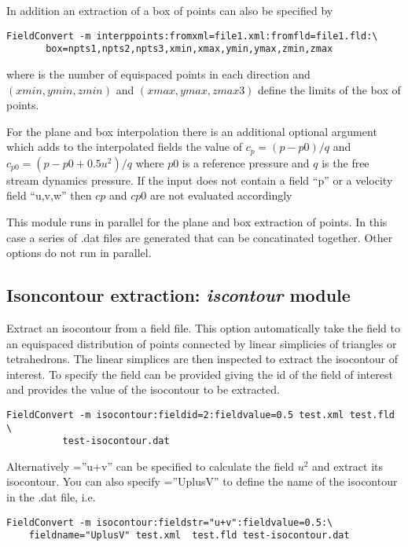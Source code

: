 In addition an extraction of a box of points can also be specified by
\begin{lstlisting}[style=BashInputStyle] 
  FieldConvert -m interppoints:fromxml=file1.xml:fromfld=file1.fld:\
       box=npts1,npts2,npts3,xmin,xmax,ymin,ymax,zmin,zmax
\end{lstlisting}
where  is the number of equispaced points in each 
direction and $(xmin,ymin,zmin)$ and $(xmax,ymax,zmax3)$ 
define the limits of the box of points. 

For the plane and box interpolation there is an additional optional
argument \inltt{cp=p0,q} which adds to the interpolated fields the value of
$c_p=(p-p0)/q$ and $c_{p0}=(p-p0+0.5 u^2)/q$ where $p0$ is a reference
pressure and $q$ is the free stream dynamics pressure. If the input
does not contain a field ``p'' or a velocity field ``u,v,w'' then $cp$
and $cp0$ are not evaluated accordingly
%
\begin{notebox} 
This module  runs in parallel for the plane and box extraction of points. In this case a series of .dat files are generated that can be concatinated together. Other options do not run in parallel.
\end{notebox}
%
%
%
\subsection{Isoncontour extraction: \textit{iscontour} module}

Extract an isocontour from a field file. This option automatically
take the field to an equispaced distribution of points connected by
linear simplicies of triangles or tetrahedrons. The linear simplices
are then inspected to extract the isocontour of interest. To specify
the field \inltt{fieldid} can be provided giving the id of the field
of interest and \inltt{fieldvalue} provides the value of the
isocontour to be extracted. 

\begin{lstlisting}[style=BashInputStyle]
  FieldConvert -m isocontour:fieldid=2:fieldvalue=0.5 test.xml test.fld \
          test-isocontour.dat
\end{lstlisting}

Alternatively =''u+v'' can be specified to calculate
the field $u^2$ and extract its isocontour. You can also specify
\inltt{fieldname}=''UplusV'' to define the name of the isocontour in
the .dat file, i.e.
\begin{lstlisting}[style=BashInputStyle]
  FieldConvert -m isocontour:fieldstr="u+v":fieldvalue=0.5:\
    fieldname="UplusV" test.xml  test.fld test-isocontour.dat
\end{lstlisting}

